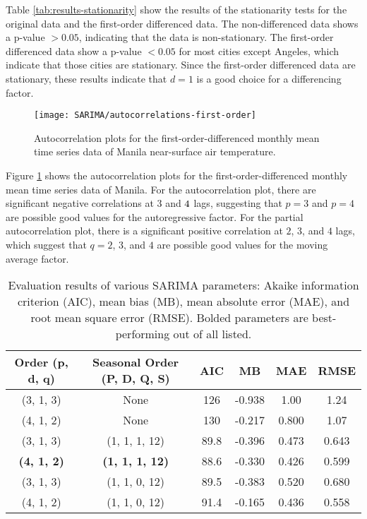 	Table \ref{tab:results-stationarity} show the results of the stationarity tests for the original data and the first-order differenced data.
	The non-differenced data shows a p-value $> 0.05$, indicating that the data is non-stationary.
	The first-order differenced data show a p-value $< 0.05$ for most cities except Angeles, which indicate that those cities are stationary.
	Since the first-order differenced data are stationary, these results indicate that $d = 1$ is a good choice for a differencing factor.
			
	\begin{figure}
		\centering
		\texttt{[image: SARIMA/autocorrelations-first-order]}
		\caption{
			Autocorrelation plots for the first-order-differenced monthly mean time series data of Manila near-surface air temperature.
		}
		\label{fig:sarima-autocorrelations}
	\end{figure}	
	
	Figure \ref{fig:sarima-autocorrelations} shows the autocorrelation plots for the first-order-differenced monthly mean time series data of Manila.
	For the autocorrelation plot, 
		there are significant negative correlations at $\num{3}$ and $\num4$ lags,
		suggesting that $p = 3$ and $p = 4$ are possible good values for the autoregressive factor.
	For the partial autocorrelation plot,
		there is a significant positive correlation at $\num{2}$, $\num{3}$, and $\num{4}$ lags,
		which suggest that $q = 2$, $3$, and $4$ are possible good values for the moving average factor.
	
	\begin{table}[]
		\centering
		\caption{
			Evaluation results of various SARIMA parameters:
			Akaike information criterion (AIC),
			mean bias (MB),
			mean absolute error (MAE),
			and
			root mean square error (RMSE).
			Bolded parameters are best-performing out of all listed.
		}
		\label{tab:evaluation-sarima-parameters}
		\begin{tabular}{ccSSSS}
			\hline \hline
			{Order (p, d, q)} & {Seasonal Order (P, D, Q, S)} & {AIC}  & {MB}     & {MAE}   & {RMSE}  \\
			\hline
			(3, 1, 3)                           & None                                            & 126  & -0.938 & 1.00  & 1.24  \\
			(4, 1, 2)                           & None                                            & 130  & -0.217 & 0.800 & 1.07  \\
			(3, 1, 3)                           & (1, 1, 1, 12)                                   & 89.8 & -0.396 & 0.473 & 0.643 \\
			\textbf{(4, 1, 2)}                  & \textbf{(1, 1, 1, 12)}                          & 88.6 & -0.330 & 0.426 & 0.599 \\
			(3, 1, 3)                           & (1, 1, 0, 12)                                   & 89.5 & -0.383 & 0.520 & 0.680 \\
			(4, 1, 2)                           & (1, 1, 0, 12)                                   & 91.4 & -0.165 & 0.436 & 0.558 \\
			\hline			
		\end{tabular}
	\end{table}

